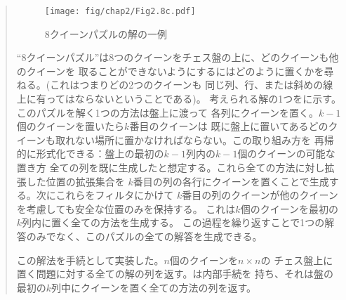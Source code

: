 \begin{quote}

\begin{figure}[tb]
\label{Figure 2.8}
\centering
\begin{comment}
\heading{Figure 2.8:} A solution to the eight-queens puzzle.

\begin{example}
+---+---+---+---+---+---+---+---+
|   |   |   |   |   | Q |   |   |
+---+---+---+---+---+---+---+---+
|   |   | Q |   |   |   |   |   |
+---+---+---+---+---+---+---+---+
| Q |   |   |   |   |   |   |   |
+---+---+---+---+---+---+---+---+
|   |   |   |   |   |   | Q |   |
+---+---+---+---+---+---+---+---+
|   |   |   |   | Q |   |   |   |
+---+---+---+---+---+---+---+---+
|   |   |   |   |   |   |   | Q |
+---+---+---+---+---+---+---+---+
|   | Q |   |   |   |   |   |   |
+---+---+---+---+---+---+---+---+
|   |   |   | Q |   |   |   |   |
+---+---+---+---+---+---+---+---+
\end{example}
\end{comment}
\texttt{[image: fig/chap2/Fig2.8c.pdf]}      %
\par\bigskip
\noindent
{} 8クイーンパズルの解の一例
\end{figure}

``8クイーンパズル''は8つのクイーンをチェス盤の上に、どのクイーンも他のクイーンを
取ることができないようにするにはどのように置くかを尋ねる。(これはつまりどの2つのクイーンも
同じ列、行、または斜めの線上に有ってはならないということである)。
考えられる解の1つをに示す。このパズルを解く1つの方法は盤上に渡って
各列にクイーンを置く。\( k - 1 \)個のクイーンを置いたら\( k \)番目のクイーンは
既に盤上に置いてあるどのクイーンも取れない場所に置かなければならない。この取り組み方を
再帰的に形式化できる：盤上の最初の\( k - 1 \)列内の\( k - 1 \)個のクイーンの可能な置き方
全ての列を既に生成したと想定する。これら全ての方法に対し拡張した位置の拡張集合を
\( k \)番目の列の各行にクイーンを置くことで生成する。次にこれらをフィルタにかけて
\( k \)番目の列のクイーンが他のクイーンを考慮しても安全な位置のみを保持する。
これは\( k \)個のクイーンを最初の\( k \)列内に置く全ての方法を生成する。
この過程を繰り返すことで1つの解答のみでなく、このパズルの全ての解答を生成できる。


この解法を手続として実装した。\( n \)個のクイーンを\( n \times n \)の
チェス盤上に置く問題に対する全ての解の列を返す。は内部手続を
持ち、それは盤の最初の\( k \)列中にクイーンを置く全ての方法の列を返す。


\end{quote}
